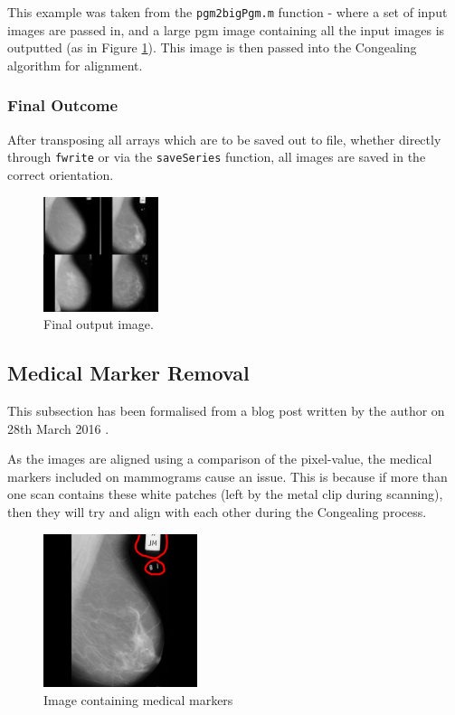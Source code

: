 This example was taken from the \texttt{pgm2bigPgm.m} function - where a set of input images are passed in, and a large pgm image containing all the input images is outputted (as in Figure \ref{fig:final-output-4}). This image is then passed into the \Gls{Congealing} algorithm for alignment.

\subsubsection{Final Outcome}

After transposing all arrays which are to be saved out to file, whether directly through \texttt{fwrite} or via the \texttt{saveSeries} function, all images are saved in the correct orientation.

\begin{figure}[H]
  \centering
  \includegraphics[width=0.3\textwidth]{Chapter2/technical-img/big_scan.jpg}
  \caption{Final output image.}
  \label{fig:final-output-4}
\end{figure}

\subsection{Medical Marker Removal}
\label{ssec:marker-removal}

This subsection has been formalised from a blog post written by the author on 28th March 2016 \cite{Collins_2016}.

As the images are aligned using a comparison of the pixel-value, the medical markers included on mammograms cause an issue. This is because if more than one scan contains these white patches (left by the metal clip during scanning), then they will try and align with each other during the \Gls{Congealing} process.

\begin{figure}[H]
  \centering
  \includegraphics[width=0.4\textwidth]{Chapter2/technical-img/mdb196.png}
  \caption{Image containing medical markers}
  \label{fig:med-markers}
\end{figure}

